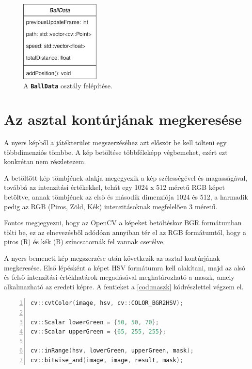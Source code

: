 \begin{figure}[!ht]
    \centering
    \includegraphics[width=40mm, keepaspectratio]{figures/balldata_class.png}
    \caption{A \textbf{\lstinline{BallData}} osztály felépítése.}
    \label{fig:balldata_class}
\end{figure}

\section{Az asztal kontúrjának megkeresése}
\label{section:megv_asztal_kontur}
A nyers képből a játékterület megszerzéséhez azt először be kell tölteni egy többdimenziós tömbbe. A kép betöltése többféleképp végbemehet, ezért ezt konkrétan nem részletezem.
\par A betöltött kép tömbjének alakja megegyezik a kép szélességével és magasságával, továbbá az intenzitási értékekkel, tehát egy 1024 x 512 méretű RGB képet betöltve, annak tömbjének az első és második dimenziója 1024 és 512, a harmadik pedig az RGB (Piros, Zöld, Kék) intenzitásoknak megfelelően 3 méretű.
\par Fontos megjegyezni, hogy az OpenCV a képeket betöltéskor BGR formátumban tölti be, ez az elnevezésből adódóan annyiban tér el az RGB formátumtól, hogy a piros (R) és kék (B) színcsatornák fel vannak cserélve.
\par A nyers bemeneti kép megszerzése után következik az asztal kontúrjának megkeresése. Első lépésként a képet HSV formátumra kell alakítani, majd az alsó és felső intenzitási értékhatárok megadásával meghatározható a maszk, amely alkalmazható az eredeti képre.
\newline A fentieket a \ref{cod:maszk} kódrészlettel végzem el.


\begin{codewrapper}
\begin{lstlisting}[language=C++, numbers=left, caption={A játékterület maszkolása.}, label={cod:maszk}]
cv::cvtColor(image, hsv, cv::COLOR_BGR2HSV);

cv::Scalar lowerGreen = {50, 50, 70};
cv::Scalar upperGreen = {65, 255, 255};

cv::inRange(hsv, lowerGreen, upperGreen, mask);
cv::bitwise_and(image, image, result, mask);
\end{lstlisting}
\end{codewrapper}

